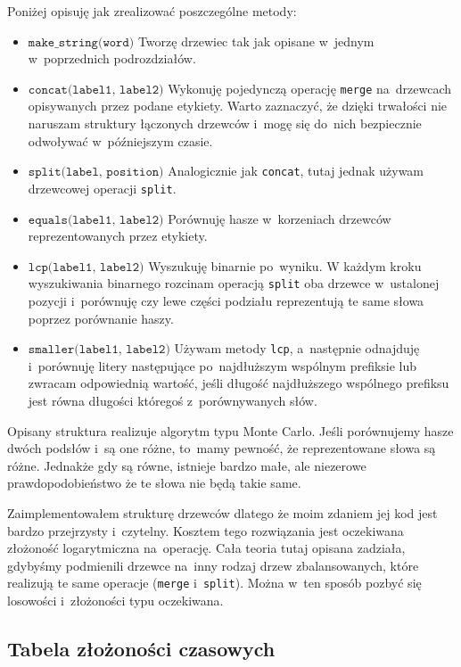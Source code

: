 \documentclass[declaration,shortabstract]{iithesis}
\theoremstyle{definition} \newtheorem{definition}{Definicja}[chapter]
\theoremstyle{plain} \newtheorem{remark}[definition]{Obserwacja}
\theoremstyle{plain} \newtheorem{theorem}[definition]{Twierdzenie}
\theoremstyle{plain} \newtheorem{example}{Przykład}[definition]
\theoremstyle{plain} \newtheorem{lemma}[definition]{Lemat}
\begin{document}
Poniżej opisuję jak zrealizować poszczególne metody:
\begin{itemize}
    \item $\texttt{make\_string(word)}$ Tworzę drzewiec tak jak opisane w~jednym w~poprzednich podrozdziałów.
    \item $\texttt{concat(label1, label2)}$ Wykonuję pojedynczą operację \texttt{merge} na~drzewcach opisywanych przez podane etykiety. Warto zaznaczyć, że dzięki trwałości nie naruszam struktury łączonych drzewców i~mogę się do~nich bezpiecznie odwoływać w~późniejszym czasie.
    \item $\texttt{split(label, position)}$ Analogicznie jak \texttt{concat}, tutaj jednak używam drzewcowej operacji \texttt{split}.
    \item $\texttt{equals(label1, label2)}$ Porównuję hasze w~korzeniach drzewców reprezentowanych przez etykiety.
    \item $\texttt{lcp(label1, label2)}$ Wyszukuję binarnie po~wyniku. W każdym kroku wyszukiwania binarnego rozcinam operacją \texttt{split} oba drzewce w~ustalonej pozycji i~porównuję czy lewe części podziału reprezentują te same słowa poprzez porównanie haszy.
    \item $\texttt{smaller(label1, label2)}$ Używam metody \texttt{lcp}, a~następnie odnajduję i~porównuję litery następujące po~najdłuższym wspólnym prefiksie lub zwracam odpowiednią wartość, jeśli długość najdłuższego wspólnego prefiksu jest równa długości któregoś z~porównywanych słów.
\end{itemize}

Opisany struktura realizuje algorytm typu Monte Carlo. Jeśli porównujemy hasze dwóch podsłów i~są one różne, to~mamy pewność, że reprezentowane słowa są różne. Jednakże gdy są równe, istnieje bardzo małe, ale niezerowe prawdopodobieństwo że te słowa nie będą takie same.

Zaimplementowałem strukturę drzewców dlatego że moim zdaniem jej kod jest bardzo przejrzysty i~czytelny. Kosztem tego rozwiązania jest oczekiwana złożoność logarytmiczna na~operację. Cała teoria tutaj opisana zadziała, gdybyśmy podmienili drzewce na~inny rodzaj drzew zbalansowanych, które realizują te same operacje (\texttt{merge} i~\texttt{split}). Można w~ten sposób pozbyć się losowości i~złożoności typu oczekiwana.

\subsection{Tabela złożoności czasowych}
\end{document}
